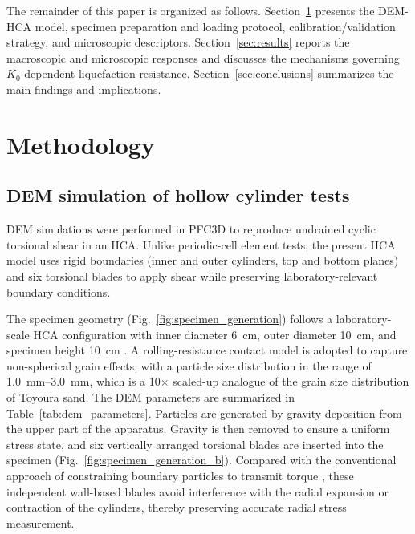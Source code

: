 \documentclass[a4paper,fleqn]{cas-sc}
\newcommand{\Kzero}{\ensuremath{K_0}}
\begin{document}
The remainder of this paper is organized as follows. Section~\ref{sec:methodology} presents the DEM-HCA model, specimen preparation and loading protocol, calibration/validation strategy, and microscopic descriptors. Section~\ref{sec:results} reports the macroscopic and microscopic responses and discusses the mechanisms governing \Kzero{}-dependent liquefaction resistance. Section~\ref{sec:conclusions} summarizes the main findings and implications.
 \section{Methodology}
\label{sec:methodology}

\subsection{DEM simulation of hollow cylinder tests}
\label{subsec:dem_hca}

DEM simulations were performed in \textsc{PFC3D} \citep{Itasca2021} to reproduce undrained cyclic torsional shear in an HCA. Unlike periodic-cell element tests, the present HCA model uses rigid boundaries (inner and outer cylinders, top and bottom planes) and six torsional blades to apply shear while preserving laboratory-relevant boundary conditions.

The specimen geometry (Fig.~\ref{fig:specimen_generation}) follows a laboratory-scale HCA configuration with inner diameter \SI{6}{cm}, outer diameter \SI{10}{cm}, and specimen height \SI{10}{cm} \citep{Vargas2020}. A rolling-resistance contact model \citep{IwashitaOda1998,WensrichKatterfeld2012} is adopted to capture non-spherical grain effects, with a particle size distribution in the range of \SIrange{1.0}{3.0}{mm}, which is a 10$\times$ scaled-up analogue of the grain size distribution of Toyoura sand. The DEM parameters are summarized in Table~\ref{tab:dem_parameters}. Particles are generated by gravity deposition from the upper part of the apparatus. Gravity is then removed to ensure a uniform stress state, and six vertically arranged torsional blades are inserted into the specimen (Fig.~\ref{fig:specimen_generation_b}). Compared with the conventional approach of constraining boundary particles to transmit torque \citep[e.g.,][]{Li2014,Liu2021}, these independent wall-based blades avoid interference with the radial expansion or contraction of the cylinders, thereby preserving accurate radial stress measurement.
\end{document}
